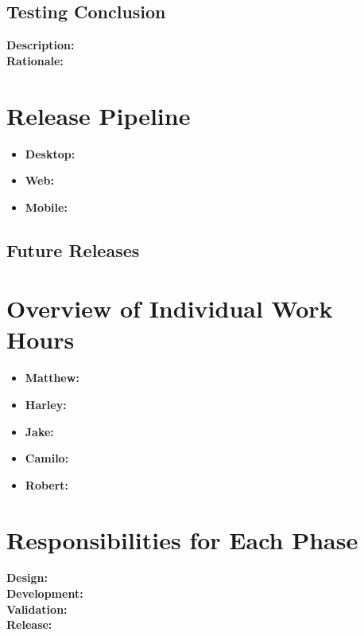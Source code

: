 \documentclass[12pt]{article}
\begin{document}
\subsection{Testing Conclusion}
\textbf{Description:}
\\
\textbf{Rationale:}


\section{Release Pipeline}
\begin{itemize}
	\item \textbf{Desktop:}
	\item \textbf{Web:}
	\item \textbf{Mobile:}
\end{itemize}

\subsection{Future Releases}

\section{Overview of Individual Work Hours}
\begin{itemize}
	\item \textbf{Matthew:}
	\item \textbf{Harley:}
	\item \textbf{Jake:}
	\item \textbf{Camilo:}
	\item \textbf{Robert:}
\end{itemize}

\section{Responsibilities for Each Phase}
\textbf{Design:}\\


\textbf{Development:}\\


\textbf{Validation:}\\


\textbf{Release:}\\
\end{document}
